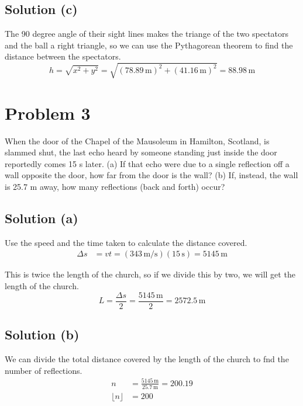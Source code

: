\documentclass[12pt]{article}
\begin{document}
        \subsection{Solution (c)}
            The 90 degree angle of their sight lines makes the triange of the two spectators and the ball a right triangle, so we can use the Pythagorean theorem to find the distance between the spectators.
            \begin{equation}
                h   =   \sqrt{x^2 + y^2}
                    =   \sqrt{(78.89\,\unit{\meter})^2 + (41.16\,\unit{\meter})^2}
                    =   \boxed{88.98\,\unit{\meter}}
            \end{equation}

    \pagebreak
    \section{Problem 3}
        When the door of the Chapel of the Mausoleum in Hamilton, Scotland, is slammed shut, the last echo heard by someone standing just inside the door reportedly comes 15 s later. 
        (a) If that echo were due to a single reflection off a wall opposite the door, how far from the door is the wall? 
        (b) If, instead, the wall is 25.7 m away, how many reflections (back and forth) occur?

        \subsection{Solution (a)}
            Use the speed and the time taken to calculate the distance covered.
            \begin{align}
                \Delta s    &=  vt
                    =   (343\,\unit{\meter/\second}) (15\,\unit{\second})
                    =   5145\,\unit{\meter}
            \end{align}

            This is twice the length of the church, so if we divide this by two, we will get the length of the church.
            \begin{equation}
                L   =   \frac{\Delta s}{2}
                    =   \frac{5145\,\unit{\meter}}{2}
                    =   \boxed{2572.5\,\unit{\meter}}
            \end{equation}

        \subsection{Solution (b)}
            We can divide the total distance covered by the length of the church to fnd the number of reflections.
            \begin{align}
                n   &=  \frac{5145\,\unit{\meter}}{25.7\,\unit{\meter}}
                    =   200.19\\
                \lfloor n \rfloor   &=  \boxed{200}
            \end{align}
\end{document}
